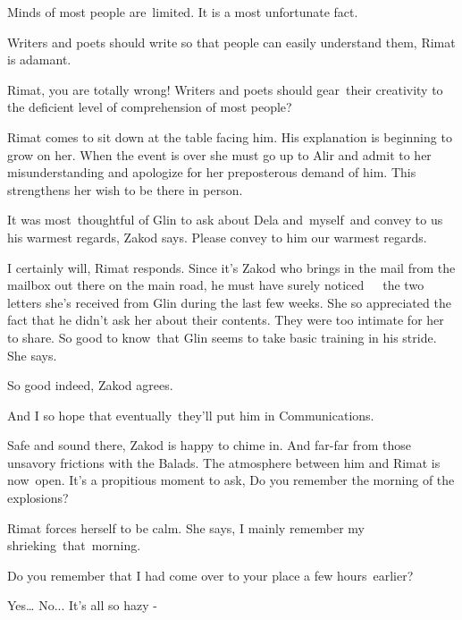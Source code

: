 \documentclass[twoside,11pt]{book}
\begin{document}
{\textquotedbl}Minds of most people are~limited. It is a most unfortunate fact.{\textquotedbl} 

{\textquotedbl}Writers and poets should write so that people can easily understand them, {\textquotedbl} Rimat is
adamant.\ 

{\textquotedbl}Rimat, you are totally wrong! Writers and poets should gear~their creativity to the deficient level of
comprehension of most people?{\textquotedbl} 

Rimat comes to sit down at the table facing him. His explanation is beginning to grow on her. When the event is over she
must go up to Alir and admit to her misunderstanding and apologize for her preposterous demand of him. This strengthens
her wish to be there in person.\ \ 

{\textquotedbl}It was most\ thoughtful of Glin to ask about Dela and{\ }myself\ and convey to us his
warmest regards,{\textquotedbl} Zakod says. {\textquotedbl}Please convey to him our warmest regards.{\textquotedbl}

{\textquotedbl}I certainly will,{\textquotedbl} Rimat responds. Since it's Zakod who brings in the mail from the mailbox
out there on the main road, he must have surely noticed\ \ \ the two letters she's received from Glin during the last
few weeks. She so appreciated the fact that he didn't ask her about their contents. They were too intimate for her to
share. {\textquotedbl}So good to know\ that Glin seems to take basic training in his stride.{\textquotedbl} She says.\ 

{\textquotedbl}So good indeed,{\textquotedbl} Zakod agrees. 

{\textquotedbl}And I so hope that eventually\ they'll put him in Communications.{\textquotedbl} 

{\textquotedbl}Safe and sound there,{\textquotedbl} Zakod is happy to chime in. {\textquotedbl}And far-far from those
unsavory frictions with the Balads.{\textquotedbl} The atmosphere between him and Rimat is now\ open. It's a propitious
moment to ask, {\textquotedbl}Do you remember the morning of the explosions?{\textquotedbl} 

Rimat forces herself to be calm. She says, {\textquotedbl}I mainly remember my shrieking~that\ morning.{\textquotedbl} 

{\textquotedbl}Do you remember that I had come over to your place a few hours~earlier?{\textquotedbl} 

{\textquotedbl}Yes{\dots} No... It's all so hazy -{\textquotedbl} 
\end{document}
